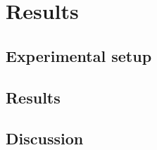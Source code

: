 \chapter{Results}
\label{ch:results}

\section{Experimental setup}
\label{sec:res-setup}

\section{Results}
\label{sec:res-results}

\section{Discussion}
\label{sec:res-discussion}

